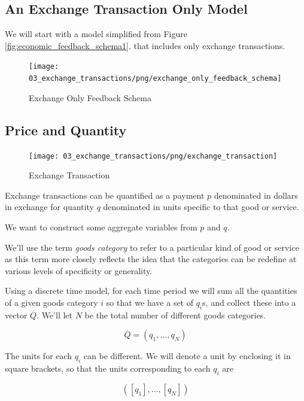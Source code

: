 \subsection{An Exchange Transaction Only Model}

We will start with a model simplified from Figure \ref{fig:economic_feedback_schema1}. that includes only
exchange transactions.

\begin{figure}[H]
\centering
\texttt{[image: 03\_exchange\_transactions/png/exchange\_only\_feedback\_schema]}
\caption{Exchange Only Feedback Schema}
\label{fig:exchange_only_feedback_schema1}
\end{figure}

\subsection{Price and Quantity}

\begin{figure}[H]
\centering
\texttt{[image: 03\_exchange\_transactions/png/exchange\_transaction]}
\caption{Exchange Transaction}
\label{fig:exchange_transaction2}
\end{figure}

Exchange transactions can be quantified as a payment $p$ denominated in dollars in exchange for
quantity $q$ denominated in units specific to that good or service.

We want to construct some aggregate variables from $p$ and $q$.

We'll use the term \textit{goods category} to refer to a particular kind of good or service as this
term more closely reflects the idea that the categories can be redefine at various levels of
specificity or generality.

Using a discrete time model, for each time period we will sum all the quantities of a given goods
category $i$ so that we have a set of $q_i$s, and collect these into a vector $\overline Q$. We'll
let $N$ be the total number of different goods categories.

\begin{equation} \label{eq:qbar}
    \overline Q = \left( q_1, \dots, q_N \right)
\end{equation}

The units for each $q_i$ can be different. We will denote a unit by enclosing it in square brackets,
so that the units corresponding to each $q_i$ are

\[ \left( \left[ q_1 \right], \dots, \left[ q_N \right] \right) \]

